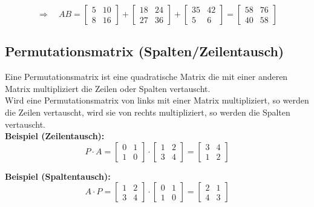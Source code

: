 \documentclass[12pt,a4paper]{article}
\begin{document}
\[
\Rightarrow
\quad
AB =
\begin{bmatrix}
    5 & 10 \\
    8 & 16
\end{bmatrix}
+
\begin{bmatrix}
    18 & 24 \\
    27 & 36
\end{bmatrix}
+
\begin{bmatrix}
    35 & 42 \\
    5 & 6
\end{bmatrix}
=
\begin{bmatrix}
    58 & 76 \\
    40 & 58
\end{bmatrix}
\]

\subsection{Permutationsmatrix (Spalten/Zeilentausch)}
Eine Permutationsmatrix ist eine quadratische Matrix die mit einer anderen Matrix multipliziert die Zeilen oder Spalten vertauscht. \\
Wird eine Permutationsmatrix von links mit einer Matrix multipliziert, so werden die Zeilen vertauscht, wird sie von rechts multipliziert, so werden die Spalten vertauscht. \\
\textbf{Beispiel (Zeilentausch):}
\[
P \cdot A
=
\begin{bmatrix}
0 & 1 \\
1 & 0
\end{bmatrix}
\cdot
\begin{bmatrix}
1 & 2 \\
3 & 4
\end{bmatrix}
=
\begin{bmatrix}
3 & 4 \\
1 & 2
\end{bmatrix}
\]

\textbf{Beispiel (Spaltentausch):}
\[
A \cdot P
=
\begin{bmatrix}
1 & 2 \\
3 & 4
\end{bmatrix}
\cdot
\begin{bmatrix}
0 & 1 \\
1 & 0
\end{bmatrix}
=
\begin{bmatrix}
2 & 1 \\
4 & 3
\end{bmatrix}
\]
\end{document}
